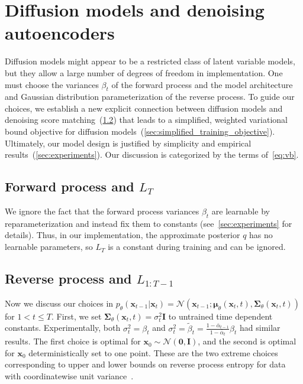 \documentclass{article}
\newcommand{\bI}{\mathbf{I}}
\newcommand{\bzero}{\mathbf{0}}
\newcommand{\bx}{\mathbf{x}}
\newcommand{\bmu}{{\boldsymbol{\mu}}}
\newcommand{\bSigma}{{\boldsymbol{\Sigma}}}
\begin{document}
\section{Diffusion models and denoising autoencoders}
\label{sec:main}

Diffusion models might appear to be a restricted class of latent variable models, but they allow a large number of degrees of freedom in implementation. One must choose the variances $\beta_t$ of the forward process and the model architecture and Gaussian distribution parameterization of the reverse process.
To guide our choices, we establish a new explicit connection between diffusion models and denoising score matching~(\cref{sec:revproc_dsm_diffusion_connection}) that leads to a simplified, weighted variational bound objective for diffusion models~(\cref{sec:simplified_training_objective}). Ultimately, our model design is justified by simplicity and empirical results~(\cref{sec:experiments}). Our discussion is categorized by the terms of~\cref{eq:vb}.


\subsection[Forward process]{Forward process and $L_T$}
We ignore the fact that the forward process variances $\beta_t$ are learnable by reparameterization and instead fix them to constants (see~\cref{sec:experiments} for details).
Thus, in our implementation, the approximate posterior $q$ has no learnable parameters, so $L_T$ is a constant during training and can be ignored.


\subsection[Reverse process]{Reverse process and  $L_{1:T-1}$} \label{sec:revproc_dsm_diffusion_connection}
Now we discuss our choices in $p_\theta(\bx_{t-1}|\bx_t) = \mathcal{N}(\bx_{t-1}; \bmu_\theta(\bx_t, t), \bSigma_\theta(\bx_t, t))$ for ${1 < t \leq T}$.
First, we set $\bSigma_\theta(\bx_t, t) = \sigma_t^2 \bI$ to untrained time dependent constants. Experimentally, both $\sigma_t^2 = \beta_t$ and $\sigma_t^2 = \tilde\beta_t = \frac{1-\bar\alpha_{t-1}}{1-\bar\alpha_t}\beta_t$ had similar results. The first choice is optimal for $\bx_0 \sim \mathcal{N}(\bzero, \bI)$, and the second is optimal for $\bx_0$ deterministically set to one point. These are the two extreme choices corresponding to upper and lower bounds on reverse process entropy for data with coordinatewise unit variance~\citep{sohl2015deep}.
\end{document}
